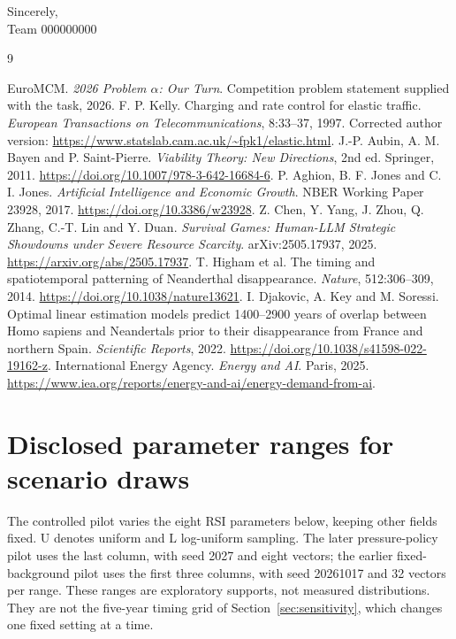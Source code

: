 \documentclass[12pt,a4paper]{article}
\theoremstyle{remark}
\newcommand{\TeamNumber}{000000000} %
\begin{document}
\medskip
Sincerely,\\
Team \TeamNumber

\clearpage
\begin{thebibliography}{9}
 EuroMCM. \emph{2026 Problem $\alpha$: Our Turn}. Competition problem statement supplied with the task, 2026.
 F. P. Kelly. Charging and rate control for elastic traffic. \emph{European Transactions on Telecommunications}, 8:33--37, 1997. Corrected author version: \url{https://www.statslab.cam.ac.uk/~fpk1/elastic.html}.
 J.-P. Aubin, A. M. Bayen and P. Saint-Pierre. \emph{Viability Theory: New Directions}, 2nd ed. Springer, 2011. \url{https://doi.org/10.1007/978-3-642-16684-6}.
 P. Aghion, B. F. Jones and C. I. Jones. \emph{Artificial Intelligence and Economic Growth}. NBER Working Paper 23928, 2017. \url{https://doi.org/10.3386/w23928}.
 Z. Chen, Y. Yang, J. Zhou, Q. Zhang, C.-T. Lin and Y. Duan. \emph{Survival Games: Human-LLM Strategic Showdowns under Severe Resource Scarcity}. arXiv:2505.17937, 2025. \url{https://arxiv.org/abs/2505.17937}.
 T. Higham et al. The timing and spatiotemporal patterning of Neanderthal disappearance. \emph{Nature}, 512:306--309, 2014. \url{https://doi.org/10.1038/nature13621}.
 I. Djakovic, A. Key and M. Soressi. Optimal linear estimation models predict 1400--2900 years of overlap between Homo sapiens and Neandertals prior to their disappearance from France and northern Spain. \emph{Scientific Reports}, 2022. \url{https://doi.org/10.1038/s41598-022-19162-z}.
 International Energy Agency. \emph{Energy and AI}. Paris, 2025. \url{https://www.iea.org/reports/energy-and-ai/energy-demand-from-ai}.
\end{thebibliography}

\appendix
\section{Disclosed parameter ranges for scenario draws}\label{app:ranges}
The controlled pilot varies the eight RSI parameters below, keeping other fields fixed. $\mathrm{U}$ denotes uniform and $\mathrm{L}$ log-uniform sampling. The later pressure-policy pilot uses the last column, with seed 2027 and eight vectors; the earlier fixed-background pilot uses the first three columns, with seed 20261017 and 32 vectors per range. These ranges are exploratory supports, not measured distributions. They are not the five-year timing grid of Section~\ref{sec:sensitivity}, which changes one fixed setting at a time.
\end{document}
